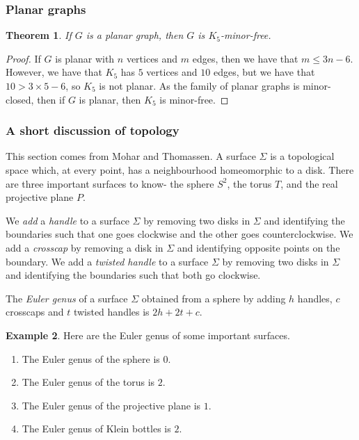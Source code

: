 \documentclass[]{report}
\newtheorem{theorem}{Theorem}
\theoremstyle{definition}
\newtheorem{example}[theorem]{Example}
\numberwithin{theorem}{section}
\numberwithin{equation}{section}
\begin{document}
\subsubsection{Planar graphs}\label{sssec:K_5-free_Planar}
\begin{theorem}\label{thm:K5_Free_Planar}
	If $G$ is a planar graph, then $G$ is $K_5$-minor-free.
\end{theorem}
\begin{proof}
	If $G$ is planar with $n$ vertices and $m$ edges, then we have that $m \leq 3n -6$. However, we have that $K_5$ has $5$ vertices and $10$ edges, but we have that $ 10 > 3 \times 5 - 6$, so $K_5$ is not planar. As the family of planar graphs is minor-closed, then if $G$ is planar, then $K_5$ is minor-free.
\end{proof}

\subsubsection{A short discussion of topology}\label{sssec:topology}
This section comes from Mohar and Thomassen\cite{moharOrientableGenusGraphs1998}. A surface $\Sigma$ is a topological space which, at every point, has a neighbourhood homeomorphic to a disk. There are three important surfaces to know- the sphere $S^2$, the torus $T$, and the real projective plane $P$.
\par
We \textit{add} a \textit{handle} to a surface $\Sigma$ by removing two disks in $\Sigma$ and identifying the boundaries such that one goes clockwise and the other goes counterclockwise. We add a \textit{crosscap} by removing a disk in $\Sigma$ and identifying opposite points on the boundary. We add a \textit{twisted handle} to a surface $\Sigma$ by removing two disks in $\Sigma$ and identifying the boundaries such that both go clockwise.
\par
The \textit{Euler genus} of a surface $\Sigma$ obtained from a sphere by adding $h$ handles, $c$ crosscaps and $t$ twisted handles is $2h + 2t + c$.

\begin{example}
	Here are the Euler genus of some important surfaces.
	\begin{enumerate}
		\item The Euler genus of the sphere is $0$.
		\item The Euler genus of the torus is $2$.
		\item The Euler genus of the projective plane is $1$. 
		\item The Euler genus of Klein bottles is $2$. 
	\end{enumerate}
\end{example}
\end{document}
